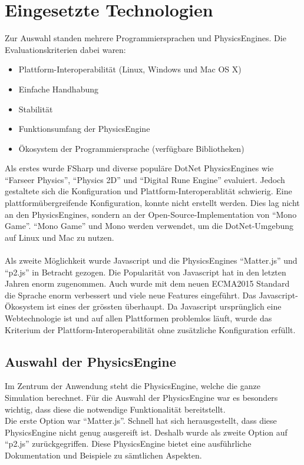   \section{Eingesetzte Technologien\label{sec:Technology}}

    Zur Auswahl standen mehrere Programmiersprachen und \glspl{PhysicsEngine}.
    Die Evaluationskriterien dabei waren:

    \begin{itemize}
      \item Plattform-Interoperabilität (Linux, Windows und Mac OS X)
      \item Einfache Handhabung
      \item Stabilität
      \item Funktionsumfang der \gls{PhysicsEngine}
      \item Ökosystem der Programmiersprache (verfügbare Bibliotheken)
    \end{itemize}

    Als erstes wurde \gls{FSharp} und diverse populäre \gls{DotNet} \glspl{PhysicsEngine} wie ``Farseer Physics'',
    ``Physics 2D'' und ``Digital Rune Engine'' evaluiert.
    Jedoch gestaltete sich die Konfiguration und Plattform-Interoperablität schwierig.
    Eine plattformübergreifende Konfiguration, konnte nicht erstellt werden.
    Dies lag nicht an den \glspl{PhysicsEngine}, sondern an der Open-Source-Implementation von ``Mono Game''.
    ``Mono Game'' und Mono werden verwendet, um die \gls{DotNet}-Umgebung auf Linux und Mac zu nutzen.
    \\
    \\
    Als zweite Möglichkeit wurde Javascript und die \glspl{PhysicsEngine} ``Matter.js'' und ``p2.js'' in Betracht gezogen.
    Die Popularität von Javascript hat in den letzten Jahren enorm zugenommen.
    Auch wurde mit dem neuen ECMA2015 Standard die Sprache enorm verbessert und viele neue Features eingeführt.
    Das Javascript-Ökosystem ist eines der grössten überhaupt.
    Da Javascript ursprünglich eine Webtechnologie ist und auf allen Plattformen problemlos läuft,
    wurde das Kriterium der Plattform-Interoperabilität ohne zusätzliche Konfiguration erfüllt.

    \subsection{Auswahl der \gls{PhysicsEngine}}

      Im Zentrum der Anwendung steht die \gls{PhysicsEngine}, welche die ganze Simulation berechnet.
      Für die Auswahl der \gls{PhysicsEngine} war es besonders wichtig,
      dass diese die notwendige Funktionalität bereitstellt.
      \\
      Die erste Option war ``Matter.js''. Schnell hat sich herausgestellt,
      dass diese \gls{PhysicsEngine} nicht genug ausgereift ist.
      Deshalb wurde als zweite Option auf ``p2.js'' zurückgegriffen.
      Diese \gls{PhysicsEngine} bietet eine ausführliche Dokumentation und Beispiele zu sämtlichen Aspekten.

